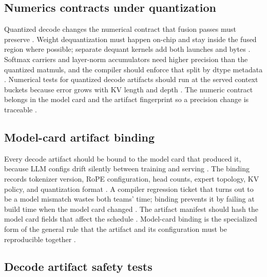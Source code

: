 \subsection{Numerics contracts under quantization}

Quantized decode changes the numerical contract that fusion passes must preserve \citep{semianalysis2024tma,patel2025llminference,memoryfloor2026}. Weight dequantization must happen on-chip and stay inside the fused region where possible; separate dequant kernels add both launches and bytes \citep{chen2020compilerbasedhardw,taxbreak2026}. Softmax carriers and layer-norm accumulators need higher precision than the quantized matmuls, and the compiler should enforce that split by dtype metadata \citep{dao2022flashattention,memoryfloor2026}. Numerical tests for quantized decode artifacts should run at the served context buckets because error grows with KV length and depth \citep{patel2025llminference,dao2022flashattention}. The numeric contract belongs in the model card and the artifact fingerprint so a precision change is traceable \citep{chen2020compilerbasedhardw,memoryfloor2026}.

\subsection{Model-card artifact binding}

Every decode artifact should be bound to the model card that produced it, because LLM configs drift silently between training and serving \citep{patel2025llminference,chen2020compilerbasedhardw,memoryfloor2026}. The binding records tokenizer version, RoPE configuration, head counts, expert topology, KV policy, and quantization format \citep{kwon2023vllm,liu2024deepseekv3,taxbreak2026}. A compiler regression ticket that turns out to be a model mismatch wastes both teams' time; binding prevents it by failing at build time when the model card changed \citep{chen2020compilerbasedhardw,patel2025llminference}. The artifact manifest should hash the model card fields that affect the schedule \citep{memoryfloor2026,taxbreak2026}. Model-card binding is the specialized form of the general rule that the artifact and its configuration must be reproducible together \citep{patel2025llminference,memoryfloor2026}.

\subsection{Decode artifact safety tests}

